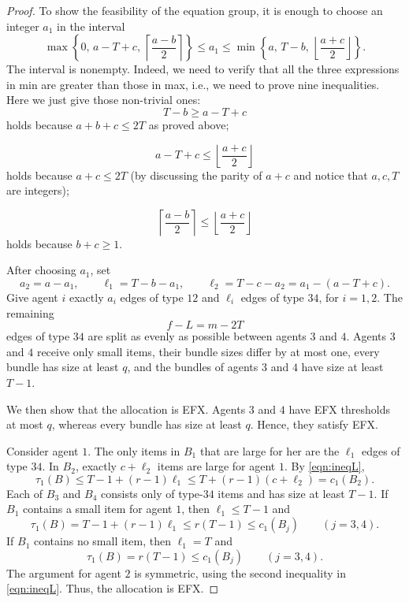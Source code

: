 \documentclass{article}
\theoremstyle{definition}
\begin{document}
\begin{proof}
To show the feasibility of the equation group, it is enough to choose an integer $a_1$ in the interval
\begin{equation}\label{eqn:maxmin}
     \max\left\{0,\,a-T+c,\,
 \left\lceil\frac{a-b}{2}\right\rceil\right\}
 \le a_1\le
 \min\left\{a,\,T-b,\,
 \left\lfloor\frac{a+c}{2}\right\rfloor\right\}.
\end{equation}
The interval is nonempty.  Indeed, we need to verify that all the three expressions in min are greater than those in max, i.e., we need to prove nine inequalities. Here we just give those non-trivial ones:
\begin{equation}\label{eqn:maxmin1}
  T-b \ge a-T+c  
\end{equation} holds because $a+b+c \le 2T$ as proved above;

\begin{equation}\label{eqn:maxmin2}
 a-T+c
 \le 
 \left\lfloor\frac{a+c}{2}\right\rfloor
\end{equation}
holds because $a+c \le 2T$ (by discussing the parity of $a+c$ and notice that $a,c,T$ are integers);

\begin{equation}\label{eqn:maxmin3}
 \left\lceil\frac{a-b}{2}\right\rceil
 \le 
 \left\lfloor\frac{a+c}{2}\right\rfloor
\end{equation}
holds because $b+c\ge 1$.

After choosing $a_1$, set
\[
 a_2=a-a_1,
 \qquad
 \ell_1=T-b-a_1,
 \qquad
 \ell_2=T-c-a_2=a_1-(a-T+c).
\]
Give agent $i$ exactly $a_i$ edges of type $12$ and $\ell_i$ edges of type
$34$, for $i=1,2$.  The remaining
\[
 f-L=m-2T
\]
edges of type $34$ are split as evenly as possible between agents $3$ and
$4$.  Agents $3$ and $4$ receive only small items, their bundle sizes differ
by at most one, every bundle has size at least $q$, and the bundles of agents
$3$ and $4$ have size at least $T-1$.

We then show that the allocation is EFX.
Agents $3$ and $4$ have EFX thresholds at most $q$, whereas every bundle has
size at least $q$.  Hence, they satisfy EFX.

Consider agent $1$.  The only items in $B_1$ that are large for her are the
$\ell_1$ edges of type $34$.  In $B_2$, exactly $c+\ell_2$ items are large
for agent $1$.  By \eqref{eqn:ineqL},
\[
 \tau_1(B)
 \le T-1+(r-1)\ell_1
 \le T+(r-1)(c+\ell_2)
 =c_1(B_2).
\]
Each of $B_3$ and $B_4$ consists only of type-$34$ items and has size at least
$T-1$.  If $B_1$ contains a small item for agent $1$, then
$\ell_1\le T-1$ and
\[
 \tau_1(B)=T-1+(r-1)\ell_1
 \le r(T-1)
 \le c_1(B_j)
 \qquad(j=3,4).
\]
If $B_1$ contains no small item, then $\ell_1=T$ and
\[
 \tau_1(B)=r(T-1)\le c_1(B_j)
 \qquad(j=3,4).
\]
The argument for agent $2$ is symmetric, using the second inequality in \eqref{eqn:ineqL}.
Thus, the allocation is EFX.


\end{proof}
\end{document}

